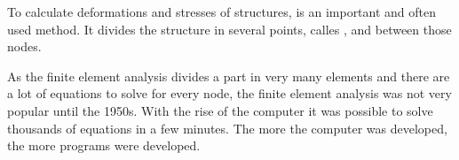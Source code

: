 To calculate deformations and stresses of structures,  is an important and often used method. It divides the structure in several points, calles , and  between those nodes. 

As the finite element analysis divides a part in very many elements and there are a lot of equations to solve for every node, the finite element analysis was not very popular until the 1950s. With the rise of the computer it was possible to solve thousands of equations in a few minutes. The more the computer was developed, the more programs were developed.